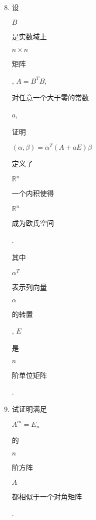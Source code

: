 \documentclass[10pt]{article}
\begin{document}
\begin{enumerate}
  \setcounter{enumi}{7}
  \item \begin{CJK}{UTF8}{mj}设\end{CJK} $B$ \begin{CJK}{UTF8}{mj}是实数域上\end{CJK} $n \times n$ \begin{CJK}{UTF8}{mj}矩阵\end{CJK}, $A=B^{T} B$, \begin{CJK}{UTF8}{mj}对任意一个大于零的常数\end{CJK} $a$, \begin{CJK}{UTF8}{mj}证明\end{CJK} $(\alpha, \beta)=\alpha^{T}(A+a E) \beta$ \begin{CJK}{UTF8}{mj}定义了\end{CJK} $\mathbb{R}^{n}$ \begin{CJK}{UTF8}{mj}一个内积使得\end{CJK} $\mathbb{R}^{n}$ \begin{CJK}{UTF8}{mj}成为欧氏空间\end{CJK}. \begin{CJK}{UTF8}{mj}其中\end{CJK} $\alpha^{T}$ \begin{CJK}{UTF8}{mj}表示列向量\end{CJK} $\alpha$ \begin{CJK}{UTF8}{mj}的转置\end{CJK}, $E$ \begin{CJK}{UTF8}{mj}是\end{CJK} $n$ \begin{CJK}{UTF8}{mj}阶单位矩阵\end{CJK}.

  \item \begin{CJK}{UTF8}{mj}试证明满足\end{CJK} $A^{m}=E_{n}$ \begin{CJK}{UTF8}{mj}的\end{CJK} $n$ \begin{CJK}{UTF8}{mj}阶方阵\end{CJK} $A$ \begin{CJK}{UTF8}{mj}都相似于一个对角矩阵\end{CJK}.


\end{enumerate}
\end{document}
